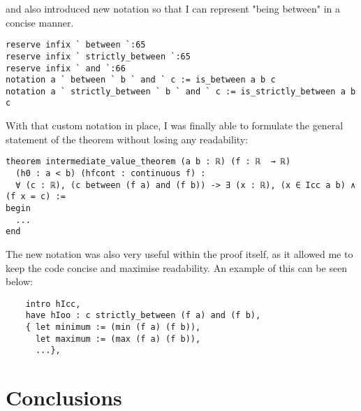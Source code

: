 \documentclass[11pt]{article}
\begin{document}
and also introduced new notation so that I can represent "being between" in a concise manner.

\begin{verbatim}
reserve infix ` between `:65
reserve infix ` strictly_between `:65
reserve infix ` and `:66
notation a ` between ` b ` and ` c := is_between a b c
notation a ` strictly_between ` b ` and ` c := is_strictly_between a b c
\end{verbatim}
With that custom notation in place, I was finally able to formulate the general
statement of the theorem without losing any readability:

\begin{verbatim}
theorem intermediate_value_theorem (a b : ℝ) (f : ℝ  → ℝ)
  (h0 : a < b) (hfcont : continuous f) :
  ∀ (c : ℝ), (c between (f a) and (f b)) -> ∃ (x : ℝ), (x ∈ Icc a b) ∧ (f x = c) :=
begin
  ...
end
\end{verbatim}
The new notation was also very useful within the proof itself, as it allowed me
to keep the code concise and maximise readability. An example of this can be seen
below:

\begin{verbatim}
    intro hIcc,
    have hIoo : c strictly_between (f a) and (f b),
    { let minimum := (min (f a) (f b)),
      let maximum := (max (f a) (f b)),
      ...},
\end{verbatim}

\section*{Conclusions}
\end{document}
